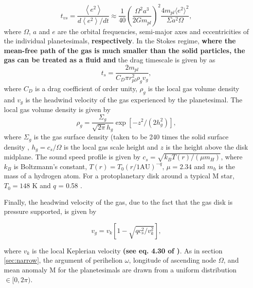 \documentclass[twocolumn,linenumbers]{aastex63}
\begin{document}
\begin{equation}\label{eq:vs_timescale}
    t_{vs}  = \frac{\left< e^2 \right>}{d \left< e^2 \right> / dt} \approx \frac{1}{40}\left(\frac{\Omega^{2} a^{3}}{2 G m_{pl}}\right)^{2} \frac{4 m_{pl} \langle e^{2} \rangle^{2}}{\Sigma a^{2} \Omega},
\end{equation}
where $\Omega$, $a$ and $e$ are the orbital frequencies, semi-major axes and eccentricities of the individual planetesimals, \textbf{respectively}. In the Stokes regime, \textbf{where the mean-free path of the gas is much smaller than the solid particles, the gas can be treated as a fluid and} the drag timescale is given by \citet{adachi76} as
\begin{equation}\label{eq:ts_stokes}
    t_{s} = \frac{2 m_{pl}}{C_{D} \pi r_{pl}^{2} \rho_{g} v_{g}},
\end{equation}
where $C_{D}$ is a drag coefficient of order unity, $\rho_{g}$ is the local gas volume density and $v_{g}$ is the headwind velocity of the gas experienced by the planetesimal. The local gas volume density is given by
\begin{equation}\label{eq:rho_gas}
	\rho_{g} = \frac{\Sigma_{g}}{\sqrt{2 \pi} h_{g}} \exp\left[ -z^{2} / \left( 2 h_{g}^{2} \right) \right],
\end{equation}
where $\Sigma_{g}$ is the gas surface density (taken to be
240 times the solid surface density \citep{hayashi81}, $h_{g} = c_{s} / \Omega$ is the local gas scale height and $z$ is the height above the disk midplane. The sound speed profile is given by $c_{s} = \sqrt{k_{B} T(r) / \left( \mu m_{H} \right)}$, where $k_{B}$ is Boltzmann's constant, $T(r) = T_{0} \left( r / 1 \textrm{AU} \right)^{-q}$, $\mu = 2.34$ and $m_{h}$ is the mass of a hydrogen atom. For a protoplanetary disk around a typical M star, $T_{0} = 148$ K and $q$ = 0.58 \citep{andrews05}.

Finally, the headwind velocity of the gas, due to the fact that the gas disk is pressure supported, is given by

\begin{equation}\label{eq:v_gas}
	v_{g} = v_{k} \left[ 1 - \sqrt{ q c_{s}^2 / v_{k}^2} \right],
\end{equation}

\noindent where $v_{k}$ is the local Keplerian velocity \textbf{(see eq. 4.30 of \citet{armitage20})}. As in section
\ref{sec:narrow}, the argument of perihelion $\omega$, longitude of
ascending node $\Omega$, and mean anomaly M for the planetesimals are drawn from a uniform distribution $\in [0, 2 \pi)$.
\end{document}
